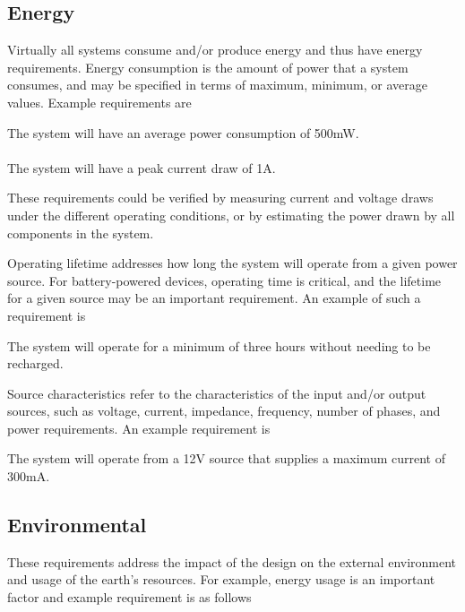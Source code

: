 \subsection*{Energy}
\label{subsection:energy}

Virtually all systems consume and/or produce energy and thus have energy
requirements. Energy consumption is the amount of power that a system
consumes, and may be specified in terms of maximum, minimum, or average
values. Example requirements are

\begin{itquote}
The system will have an average power consumption of 500mW. \\ \\
The system will have a peak current draw of 1A.
\end{itquote}

These requirements could be verified by measuring current and voltage
draws under the different operating conditions, or by estimating the
power drawn by all components in the system.


Operating lifetime addresses how long the system will operate from a
given power source. For battery-powered devices, operating time is
critical, and the lifetime for a given source may be an important
requirement. An example of such a requirement is

\begin{itquote}
The system will operate for a minimum of three hours without needing to
be recharged.
\end{itquote}

Source characteristics refer to the characteristics of the input and/or
output sources, such as voltage, current, impedance, frequency, number
of phases, and power requirements. An example requirement is

\begin{itquote}
The system will operate from a 12V source that supplies a maximum
current of 300mA.
\end{itquote}

\subsection*{Environmental}
\label{subsection:environmental}

These requirements address the impact of the design on the external
environment and usage of the earth's resources. For example, energy
usage is an important factor and example requirement is as follows

